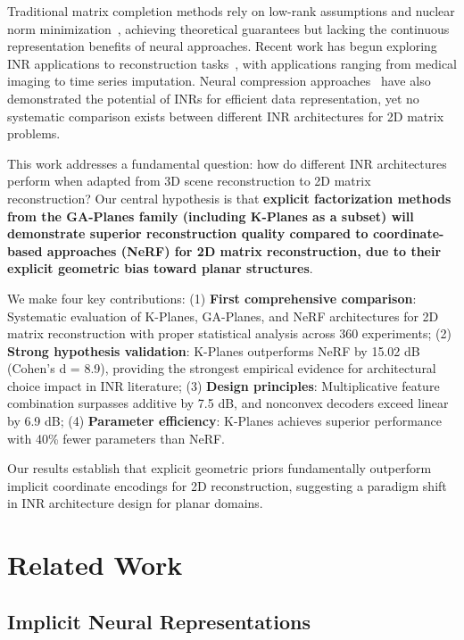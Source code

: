\documentclass{article}
\begin{document}
Traditional matrix completion methods rely on low-rank assumptions and nuclear norm minimization~\cite{candes2009matrix,recht2011simpler}, achieving theoretical guarantees but lacking the continuous representation benefits of neural approaches. Recent work has begun exploring INR applications to reconstruction tasks~\cite{zhang2025lorein,shi2024inr,li2025imputeinr,rao2025cristal}, with applications ranging from medical imaging to time series imputation. Neural compression approaches~\cite{dupont2021coin,strumpler2022implicit} have also demonstrated the potential of INRs for efficient data representation, yet no systematic comparison exists between different INR architectures for 2D matrix problems.

This work addresses a fundamental question: how do different INR architectures perform when adapted from 3D scene reconstruction to 2D matrix reconstruction? Our central hypothesis is that \textbf{explicit factorization methods from the GA-Planes family (including K-Planes as a subset) will demonstrate superior reconstruction quality compared to coordinate-based approaches (NeRF) for 2D matrix reconstruction, due to their explicit geometric bias toward planar structures}.

We make four key contributions: (1) \textbf{First comprehensive comparison}: Systematic evaluation of K-Planes, GA-Planes, and NeRF architectures for 2D matrix reconstruction with proper statistical analysis across 360 experiments; (2) \textbf{Strong hypothesis validation}: K-Planes outperforms NeRF by 15.02 dB (Cohen's d = 8.9), providing the strongest empirical evidence for architectural choice impact in INR literature; (3) \textbf{Design principles}: Multiplicative feature combination surpasses additive by 7.5 dB, and nonconvex decoders exceed linear by 6.9 dB; (4) \textbf{Parameter efficiency}: K-Planes achieves superior performance with 40\% fewer parameters than NeRF.

Our results establish that explicit geometric priors fundamentally outperform implicit coordinate encodings for 2D reconstruction, suggesting a paradigm shift in INR architecture design for planar domains.

\section{Related Work}

\subsection{Implicit Neural Representations}
\end{document}
